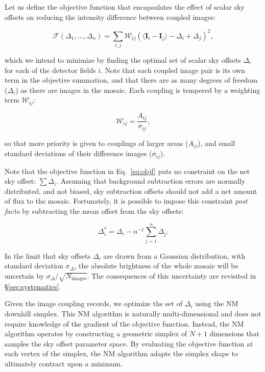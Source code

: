 \documentclass[iop]{emulateapj}
\newcommand{\vect}[1]{\boldsymbol{#1}} %
\newcommand{\Eq}[1]{Eq.~\ref{eq:#1}}  %
\newcommand{\Sec}[1]{\S\ref{sec:#1}}  %
\begin{document}
Let us define the objective function that encapsulates the effect of scalar sky offsets on reducing the intensity difference between coupled images:

\begin{equation}
    \mathcal{F} \left(\Delta_1,\ldots,\Delta_n \right) = \sum_{i,j} \mathcal{W}_{ij} \left( \langle \vect{I}_i - \vect{I}_j \rangle - \Delta_i + \Delta_j \right)^2,
    \label{eq:objf}
\end{equation}

\noindent which we intend to minimize by finding the optimal set of scalar sky offsets $\Delta_i$ for each of the detector fields $i$.
Note that each coupled image pair is its own term in the objective summation, and that there are as many degrees of freedom ($\Delta_i$) as there are images in the mosaic.
Each coupling is tempered by a weighting term $\mathcal{W}_{ij}$:

\begin{equation}
    \mathcal{W}_{ij} = \frac{A_{ij}}{\sigma_{ij}},
\end{equation}

\noindent so that more priority is given to couplings of larger areas ($A_{ij}$), and small standard deviations of their difference images ($\sigma_{ij}$).

Note that the objective function in \Eq{objf} puts no constraint on the net sky offset: $\sum \Delta_i$.
Assuming that background subtraction errors are normally distributed, and not biased, sky subtraction offsets should not add a net amount of flux to the mosaic.
Fortunately, it is possible to impose this constraint \textit{post facto} by subtracting the mean offset from the sky offsets:

\begin{equation}
    \Delta_i^* = \Delta_i - n^{-1}\sum_{j=1}^n \Delta_j.
    \label{eq:netzero}
\end{equation}

\noindent In the limit that sky offsets $\Delta_i$ are drawn from a Gaussian distribution, with standard deviation $\sigma_\Delta$, the absolute brightness of the whole mosaic will be uncertain by $\sigma_\Delta / \sqrt{N_\mathrm{images}}$.
The consequences of this uncertainty are revisited in \Sec{systematics}.

Given the image coupling records, we optimize the set of $\Delta_i$ using the NM downhill simplex.
This NM algorithm is naturally multi-dimensional and does not require knowledge of the gradient of the objective function.
Instead, the NM algorithm operates by constructing a geometric simplex of $N+1$ dimensions that samples the sky offset parameter space.
By evaluating the objective function at each vertex of the simplex, the NM algorithm adapts the simplex shape to ultimately contract upon a minimum.
\end{document}
